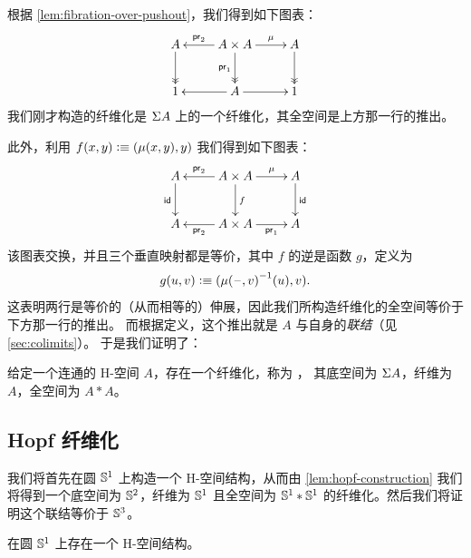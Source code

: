 根据 \cref{lem:fibration-over-pushout}，我们得到如下图表：
%
\[\xymatrix{A \ar@{->>}[d] & A \times A \ar[l]_-{\proj2} \ar@{->>}_{\proj1}[d]
  \ar[r]^-{\mu} & A \ar@{->>}[d] \\
  1 & A \ar[r] \ar[l] & 1}\]
%
我们刚才构造的纤维化是 $\Sigma A$ 上的一个纤维化，其全空间是上方那一行的推出。

此外，利用 $f(x,y)\vcentcolon\equiv(\mu(x,y),y)$ 我们得到如下图表：
%
\[\xymatrix{A \ar_{\idfunc}[d] & A \times A \ar[l]_-{\proj2} \ar^f[d]
  \ar[r]^-{\mu} & A \ar^{\idfunc}[d] \\
  A & A\times A \ar^-{\proj2}[l] \ar_-{\proj1}[r] & A}\]
%
该图表交换，并且三个垂直映射都是等价，其中 $f$ 的逆是函数 $g$，定义为
\[g(u,v)\vcentcolon\equiv(\mathord{{\mu(\mathord{\hspace{1pt}\text{--}\hspace{1pt}},v)}^{-1}}(u),v).\]
%
这表明两行是等价的（从而相等的）伸展，因此我们所构造纤维化的全空间等价于下方那一行的推出。
而根据定义，这个推出就是 $A$ 与自身的\emph{联结}（见 \cref{sec:colimits}）。
%
于是我们证明了：

\begin{lem}\label{lem:hopf-construction}
  给定一个连通的 H-空间 $A$，存在一个纤维化，称为
  ，
  其底空间为 $\Sigma A$，纤维为 $A$，全空间为 $A*A$。
\end{lem}

\subsection{Hopf 纤维化}

我们将首先在圆 $\mathbb{S}^1$ 上构造一个 H-空间结构，从而由
\cref{lem:hopf-construction} 我们将得到一个底空间为 $\mathbb{S}^2$，纤维为
$\mathbb{S}^1$ 且全空间为 $\mathbb{S}^1*\mathbb{S}^1$ 的纤维化。然后我们将证明这个联结等价于 $\mathbb{S}^3$。

\begin{lem}\label{lem:hspace-S1}
  在圆 $\mathbb{S}^1$ 上存在一个 H-空间结构。
\end{lem}

